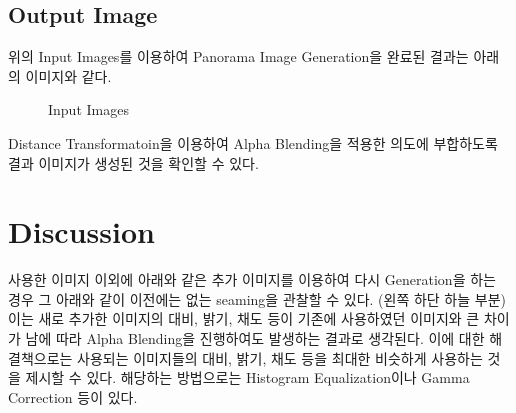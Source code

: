 \documentclass{report}
\begin{document}
\subsection*{Output Image}

위의 Input Images를 이용하여 Panorama Image Generation을 완료된 결과는 아래의 이미지와 같다.

\begin{figure}[htbp]
    \centering


    \caption{Input Images}
\end{figure}

Distance Transformatoin을 이용하여 Alpha Blending을 적용한 의도에 부합하도록 결과 이미지가 생성된 것을 확인할 수 있다.

\newpage

\section*{Discussion}

사용한 이미지 이외에 아래와 같은 추가 이미지를 이용하여 다시 Generation을 하는 경우 그 아래와 같이 이전에는 없는 seaming을 관찰할 수 있다.
(왼쪽 하단 하늘 부분)
이는 새로 추가한 이미지의 대비, 밝기, 채도 등이 기존에 사용하였던 이미지와 큰 차이가 남에 따라 Alpha Blending을 진행하여도 발생하는 결과로 생각된다.
이에 대한 해결책으로는 사용되는 이미지들의 대비, 밝기, 채도 등을 최대한 비슷하게 사용하는 것을 제시할 수 있다.
해당하는 방법으로는 Histogram Equalization이나 Gamma Correction 등이 있다.
\end{document}

